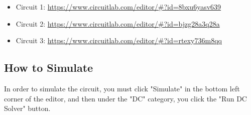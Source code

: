 \documentclass[12pt]{article}
\begin{document}
\begin{itemize}
    \item Circuit 1: \url{https://www.circuitlab.com/editor/#?id=8bxu6yasv639}
    \item Circuit 2: \url{https://www.circuitlab.com/editor/#?id=bjzg28a3q28a}
    \item Circuit 3: \url{https://www.circuitlab.com/editor/#?id=rtexy736m8qq}
  \end{itemize}

\pagebreak

\subsection{How to Simulate}
In order to simulate the circuit, you must click "Simulate" in the bottom left corner of the editor, and then under the "DC" category, you click the "Run DC Solver" button.
\end{document}

